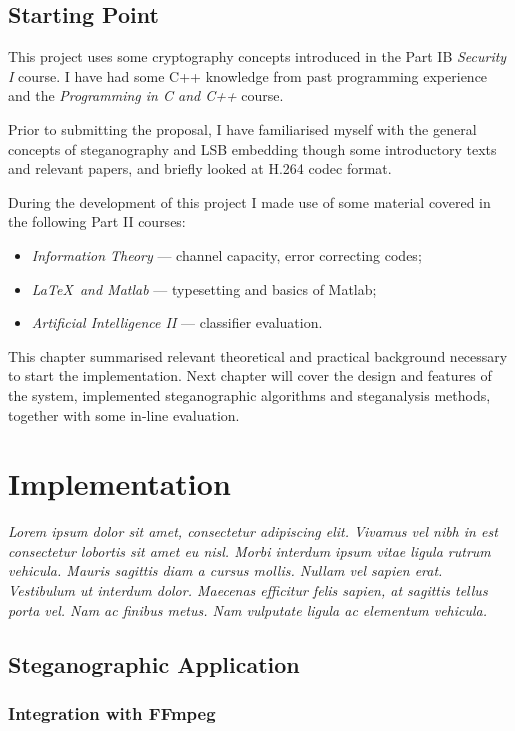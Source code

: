 \documentclass[12pt,british,twoside,notitlepage,usenames,dvipsnames,hypens,final]{report}
\numberwithin{equation}{section}
\numberwithin{figure}{section}
\begin{document}
\section{Starting Point}
This project uses some cryptography concepts introduced in the Part IB \textit{Security I} course. I have had some C++ knowledge from past programming experience and the \textit{Programming in C and C++} course. 

Prior to submitting the proposal, I have familiarised myself with the general concepts of steganography and LSB embedding though some introductory texts and relevant papers, and briefly looked at H.264 codec format.

During the development of this project I made use of some material covered in the following Part II courses:
\begin{itemize}
\item \textit{Information Theory} --- channel capacity, error correcting codes;
\item \textit{\LaTeX~and Matlab} --- typesetting and basics of Matlab;
\item \textit{Artificial Intelligence II} --- classifier evaluation.
\end{itemize}

\bigskip
This chapter summarised relevant theoretical and practical background necessary to start the implementation. Next chapter will cover the design and features of the system, implemented steganographic algorithms and steganalysis methods, together with some in-line evaluation.

\cleardoublepage
\chapter{Implementation}

\textit{Lorem ipsum dolor sit amet, consectetur adipiscing elit. Vivamus vel nibh in est consectetur lobortis sit amet eu nisl. Morbi interdum ipsum vitae ligula rutrum vehicula. Mauris sagittis diam a cursus mollis. Nullam vel sapien erat. Vestibulum ut interdum dolor. Maecenas efficitur felis sapien, at sagittis tellus porta vel. Nam ac finibus metus. Nam vulputate ligula ac elementum vehicula.}

\section{Steganographic Application}

\subsection{Integration with FFmpeg}
\end{document}
